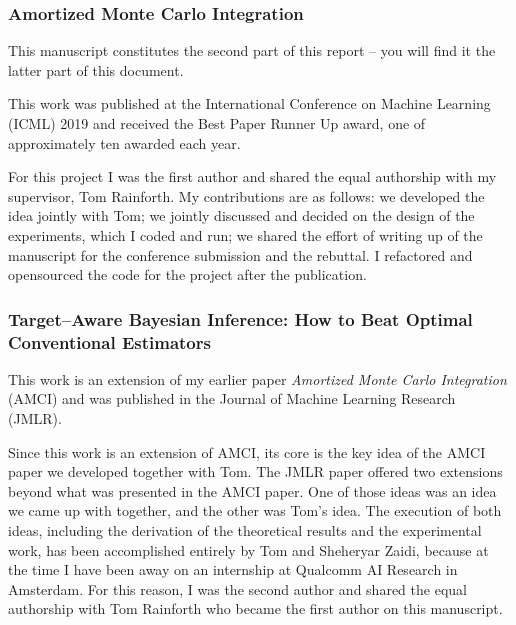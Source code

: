 \documentclass[12pt]{article}
\begin{document}
\subsubsection{Amortized Monte Carlo Integration}%

This manuscript constitutes the second part of this report -- you will find it the latter part of this document.

This work was published at the International Conference on Machine Learning (ICML) 2019 and received the Best Paper Runner Up award, one of approximately ten awarded each year.

For this project I was the first author and shared the equal authorship with my supervisor, Tom Rainforth.
My contributions are as follows: we developed the idea jointly with Tom; 
we jointly discussed and decided on the design of the experiments, which I coded and run; 
we shared the effort of writing up of the manuscript for the conference submission and the rebuttal.
I refactored and opensourced the code for the project after the publication.

\subsubsection{Target–Aware Bayesian Inference: How to Beat Optimal Conventional Estimators}%

This work is an extension of my earlier paper \emph{Amortized Monte Carlo Integration} (AMCI)
and
was published in the Journal of Machine Learning Research (JMLR).

Since this work is an extension of AMCI, its core is the key idea of the AMCI paper we developed together with Tom.
The JMLR paper offered two extensions beyond what was presented in the AMCI paper.
One of those ideas was an idea we came up with together, and the other was Tom's idea.
The execution of both ideas, including the derivation of the theoretical results and the experimental work, has been accomplished entirely by Tom and Sheheryar Zaidi, 
because at the time I have been away on an internship at Qualcomm AI Research in Amsterdam.
For this reason, I was the second author and shared the equal authorship with Tom Rainforth who became the first author on this manuscript.

\end{document}
